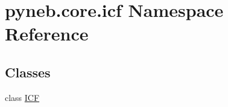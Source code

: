 \hypertarget{namespacepyneb_1_1core_1_1icf}{\section{pyneb.\-core.\-icf Namespace Reference}
\label{namespacepyneb_1_1core_1_1icf}
}
\subsection*{Classes}
\begin{DoxyCompactItemize}
\item 
class \hyperlink{classpyneb_1_1core_1_1icf_1_1_i_c_f}{I\-C\-F}
\end{DoxyCompactItemize}
